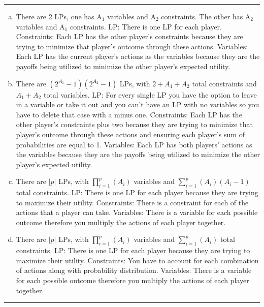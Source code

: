 \documentclass[11pt]{article}
\newcommand{\answer}[1]{
\vspace{.5\baselineskip} \hrule \vspace{.5\baselineskip}
#1
\vspace{.5\baselineskip} \hrule \vspace{.5\baselineskip}
}
\begin{document}
\answer{

\begin{enumerate}[(a)]

\item
There are 2 LPs, one has A$_1$ variables and A$_2$ constraints. The other has A$_2$ variables and A$_1$ constraints.
\newline
LP: There is one LP for each player.
\newline
Constraints: Each LP has the other player's constraints because they are trying to minimize that player's outcome through these actions.
\newline
Variables: Each LP has the current player's actions as the variables because they are the payoffs being utilized to minimize the other player's expected utility.

\item
There are $(2^{A_1}-1)(2^{A_2}-1)$ LPs, with $2 + A_1 + A_2$ total constraints and $A_1 + A_2$ total variables.
\newline
LP: For every single LP you have the option to leave in a variable or take it out and you can't have an LP with no variables so you have to delete that case with a minus one.
\newline
Constraints: Each LP has the other player's constraints plus two because they are trying to minimize that player's outcome through these actions and ensuring each player's sum of probabilities are equal to 1.
\newline
Variables: Each LP has both players' actions as the variables because they are the payoffs being utilized to minimize the other player's expected utility.

\item
There are  $\vert p\vert$ LPs, with $\prod_{i=1}^{p} (A_i)$ variables and $\sum_{i=1}^{p} (A_i)(A_i - 1)$ total constraints.
\newline
LP: There is one LP for each player because they are trying to maximize their utility.
\newline
Constraints: There is a constraint for each of the actions that a player can take.
\newline
Variables: There is a variable for each possible outcome therefore you multiply the actions of each player together.  

\item
There are  $\vert p\vert$ LPs, with $\prod_{i=1}^{p} (A_i)$ variables and $\sum_{i=1}^{p} (A_i)$ total constraints.
\newline
LP: There is one LP for each player because they are trying to maximize their utility.
\newline
Constraints: You have to account for each combination of actions along with probability distribution.
\newline
Variables: There is a variable for each possible outcome therefore you multiply the actions of each player together.
\end{enumerate}

}
\end{document}
